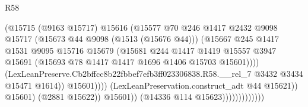 \begin{lexlean}{R58}
\begin{coremodule}
{{                                              (@15715
                                                (@9163 @15717)
                                                @15616
                                                (@15577
                                                  @70
                                                  @246
                                                  @1417
                                                  @2432
                                                  @9098
                                                  @15717
                                                  (@15673 @44 @9098 (@1513 (@15676 @44)))
                                                  (@15667
                                                    @245
                                                    @1417
                                                    @1531
                                                    @9095
                                                    @15716
                                                    @15679
                                                    (@15681
                                                      @244
                                                      @1417
                                                      @1419
                                                      @15557
                                                      @3947
                                                      @15691
                                                      (@15693
                                                        @78
                                                        @1417
                                                        @1417
                                                        @1696
                                                        @1406
                                                        @15703
                                                        @15601))))
                                                (LexLeanPreserve.Cb2bffcc8b22fbbef7efb3ff023306838.R58.__rel_7
                                                  @3432
                                                  @3434
                                                  @15471
                                                  @1614))
                                              @15601))))
                                      (LexLeanPreservation.construct_adt @44 @15621))
                                    @15601)
                                  (@2881 @15622))
                                @15601))
                            (@14336 @114 @15623)))))))))))))
}}
\end{coremodule}
\end{lexlean}
